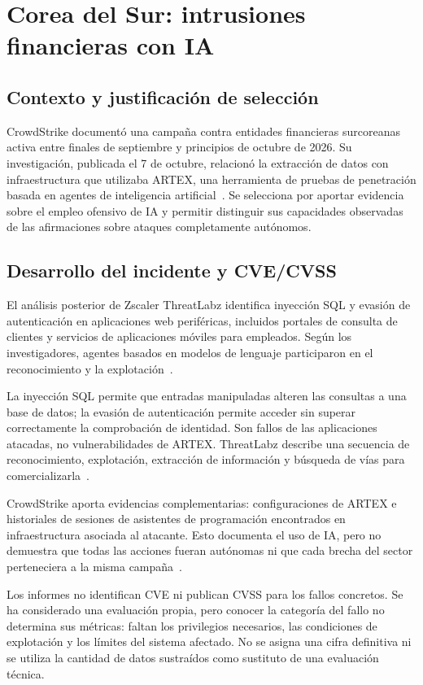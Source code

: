 \chapter{Corea del Sur: intrusiones financieras con IA}
\label{chap:incidente5}

\section{Contexto y justificación de selección}
CrowdStrike documentó una campaña contra entidades
financieras surcoreanas activa entre finales de septiembre
y principios de octubre de 2026. Su investigación,
publicada el 7 de octubre, relacionó la extracción de datos
con infraestructura que utilizaba ARTEX, una herramienta
de pruebas de penetración basada en agentes de
inteligencia artificial~\cite{crowdstrike2026artex}.
Se selecciona por aportar evidencia sobre el empleo
ofensivo de IA y permitir distinguir sus capacidades
observadas de las afirmaciones sobre ataques
completamente autónomos.

\section{Desarrollo del incidente y CVE/CVSS}
El análisis posterior de Zscaler ThreatLabz identifica
inyección SQL y evasión de autenticación en aplicaciones
web periféricas, incluidos portales de consulta de clientes
y servicios de aplicaciones móviles para empleados.
Según los investigadores, agentes basados en modelos
de lenguaje participaron en el reconocimiento y
la explotación~\cite{zscaler2026corea}.

La inyección SQL permite que entradas manipuladas
alteren las consultas a una base de datos; la evasión
de autenticación permite acceder sin superar correctamente
la comprobación de identidad. Son fallos de las aplicaciones
atacadas, no vulnerabilidades de ARTEX.
ThreatLabz describe una secuencia de reconocimiento,
explotación, extracción de información y búsqueda de
vías para comercializarla~\cite{zscaler2026corea}.

CrowdStrike aporta evidencias complementarias:
configuraciones de ARTEX e historiales de sesiones
de asistentes de programación encontrados en
infraestructura asociada al atacante.
Esto documenta el uso de IA, pero no demuestra que
todas las acciones fueran autónomas ni que cada
brecha del sector perteneciera a la misma
campaña~\cite{crowdstrike2026artex,fsc2026octubre}.

Los informes no identifican CVE ni publican CVSS
para los fallos concretos.
Se ha considerado una evaluación propia, pero conocer
la categoría del fallo no determina sus métricas:
faltan los privilegios necesarios, las condiciones
de explotación y los límites del sistema afectado.
No se asigna una cifra definitiva ni se utiliza
la cantidad de datos sustraídos como sustituto
de una evaluación técnica.

